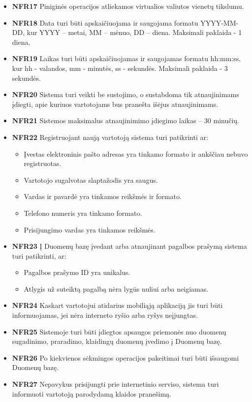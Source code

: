 \documentclass{VUMIFPSbakalaurinis}
\begin{document}
\begin{itemize}
	\item \textbf{NFR17} Piniginės operacijos atliekamos virtualios valiutos vienetų tikslumu.
	\item \textbf{NFR18} Data turi būti apskaičiuojama ir saugojama formatu YYYY-MM-DD, kur YYYY – metai, MM – mėnuo, DD – diena. Maksimali paklaida - 1 diena.
	\item \textbf{NFR19} Laikas turi būti apskaičiuojamas ir saugojamas formatu hh:mm:ss, kur hh - valandos, mm - minutės, ss - sekundės. Maksimali paklaida - 3 sekundės.
\end{itemize}

\begin{itemize}
	\item \textbf{NFR20} Sistema turi veikti be sustojimo, o sustabdoma tik atnaujinimams įdiegti, apie kuriuos vartotojams bus pranešta išėjus atnaujinimams.
	\item \textbf{NFR21} Sistemos maksimalus atnaujinimimo įdiegimo laikas – 30 minučių.
	\item \textbf{NFR22} Registruojant naują vartotoją sistema turi patikrinti ar:
	\begin{itemize}
		\item Įvestas elektroninis pašto adresas yra tinkamo formato ir ankščiau nebuvo registruotas.
		\item Vartotojo sugalvotas slaptažodis yra saugus.
		\item Vardas ir pavardė yra tinkamos reikšmės ir formato.
		\item Telefono numeris yra tinkamo formato.
		\item Prisijungimo vardas yra tinkamos reikšmės.
	\end{itemize}
	\item \textbf{NFR23} Į Duomenų bazę įvedant arba atnaujinant pagalbos prašymą sistema turi patikrinti, ar:
	\begin{itemize}
		\item Pagalbos prašymo ID yra unikalus.
		\item Atlygis už suteiktą pagalbą nėra lygūs nuliui arba neigiamas.
	\end{itemize}
\end{itemize}

\begin{itemize}
	\item \textbf{NFR24} Kaskart vartotojui atidarius mobiliąją aplikaciją jis turi būti informuojamas, jei nėra interneto ryšio arba ryšys neįjungtas.
	\item \textbf{NFR25} Sistemoje turi būti įdiegtos apsaugos priemonės nuo duomenų sugadinimo, praradimo, klaidingų duomenų įvedimo į Duomenų bazę.
	\item \textbf{NFR26} Po kiekvienos sėkmingos operacijos pakeitimai turi būti išsaugomi Duomenų bazę.
	\item \textbf{NFR27} Nepavykus prisijungti prie internetinio serviso, sistema turi informuoti vartotoją parodydamą klaidos pranešimą.
\end{itemize}
\end{document}
